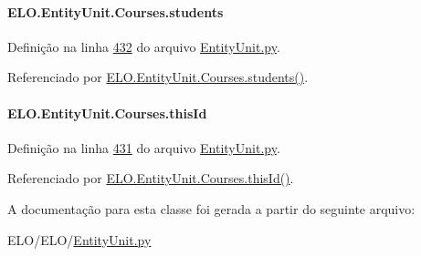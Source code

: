 \paragraph[{students}]{\setlength{\rightskip}{0pt plus 5cm}E\+L\+O.\+Entity\+Unit.\+Courses.\+students}\label{classELO_1_1EntityUnit_1_1Courses_ac8e5e595ec895e03b088764d7506e735}


Definição na linha \hyperlink{EntityUnit_8py_source_l00432}{432} do arquivo \hyperlink{EntityUnit_8py_source}{Entity\+Unit.\+py}.



Referenciado por \hyperlink{classELO_1_1EntityUnit_1_1Courses_a5a263b4fd9457ed3da9727def7a9c00b}{E\+L\+O.\+Entity\+Unit.\+Courses.\+students()}.

\hypertarget{classELO_1_1EntityUnit_1_1Courses_a283b817d129a8d15e3bce56b368a169d}{}
\paragraph[{this\+Id}]{\setlength{\rightskip}{0pt plus 5cm}E\+L\+O.\+Entity\+Unit.\+Courses.\+this\+Id}\label{classELO_1_1EntityUnit_1_1Courses_a283b817d129a8d15e3bce56b368a169d}


Definição na linha \hyperlink{EntityUnit_8py_source_l00431}{431} do arquivo \hyperlink{EntityUnit_8py_source}{Entity\+Unit.\+py}.



Referenciado por \hyperlink{classELO_1_1EntityUnit_1_1Courses_aff94ff51d3e76f78bf3f74f4ed959820}{E\+L\+O.\+Entity\+Unit.\+Courses.\+this\+Id()}.



A documentação para esta classe foi gerada a partir do seguinte arquivo\+:\begin{DoxyCompactItemize}
\item 
E\+L\+O/\+E\+L\+O/\hyperlink{EntityUnit_8py}{Entity\+Unit.\+py}\end{DoxyCompactItemize}
